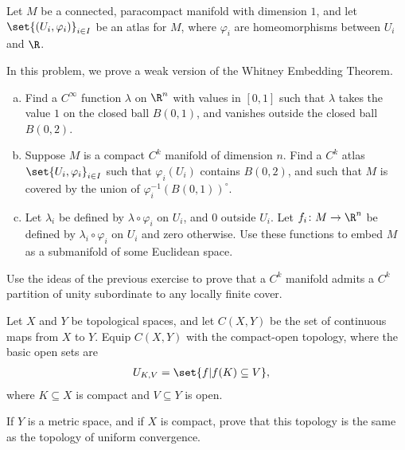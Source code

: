 \documentclass[10pt]{mypackage}
\begin{document}
\begin{solution}
  Let $M$ be a connected, paracompact manifold with dimension $1$, and let $\set{\left( U_i,\varphi_i \right)}_{i\in I}$ be an atlas for $M$, where $\varphi_i$ are homeomorphisms between $U_i$ and $\R$.
\end{solution}
\begin{problem}[Problem 5]
  In this problem, we prove a weak version of the Whitney Embedding Theorem.
  \begin{enumerate}[(a)]
    \item Find a $C^{\infty}$ function $\lambda$ on $\R^{n}$ with values in $[0,1]$ such that $\lambda$ takes the value $1$ on the closed ball $B\left( 0,1 \right)$, and vanishes outside the closed ball $B\left( 0,2 \right)$.
    \item Suppose $M$ is a compact $C^{k}$ manifold of dimension $n$. Find a $C^{k}$ atlas $\set{U_i,\varphi_i}_{i\in I}$ such that $\varphi_i\left( U_i \right)$ contains $B\left( 0,2 \right)$, and such that $M$ is covered by the union of $\varphi_i^{-1}\left( B\left( 0,1 \right) \right)^{\circ}$.
    \item Let $\lambda_i$ be defined by $\lambda\circ\varphi_i$ on $U_i$, and $0$ outside $U_i$. Let $f_i\colon M\rightarrow \R^n$ be defined by $\lambda_i\circ\varphi_i$ on $U_i$ and zero otherwise. Use these functions to embed $M$ as a submanifold of some Euclidean space.
  \end{enumerate}
\end{problem}
\begin{problem}[Problem 6]
  Use the ideas of the previous exercise to prove that a $C^{k}$ manifold admits a $C^{k}$ partition of unity subordinate to any locally finite cover.
\end{problem}
\begin{problem}[Problem 7]
  Let $X$ and $Y$ be topological spaces, and let $C\left( X,Y \right)$ be the set of continuous maps from $X$ to $Y$. Equip $C\left( X,Y \right)$ with the compact-open topology, where the basic open sets are
  \begin{align*}
    U_{K,V} &= \set{f | f(K)\subseteq V},
  \end{align*}
  where $K\subseteq X$ is compact and $V\subseteq Y$ is open.\newline

  If $Y$ is a metric space, and if $X$ is compact, prove that this topology is the same as the topology of uniform convergence.
\end{problem}
\end{document}
